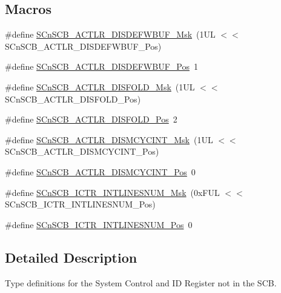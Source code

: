 \subsection*{Macros}
\begin{DoxyCompactItemize}
\item 
\#define \hyperlink{group__CMSIS__SCnSCB_ga6cda7b7219232a008ec52cc8e89d5d08}{S\+Cn\+S\+C\+B\+\_\+\+A\+C\+T\+L\+R\+\_\+\+D\+I\+S\+D\+E\+F\+W\+B\+U\+F\+\_\+\+Msk}~(1\+U\+L $<$$<$ S\+Cn\+S\+C\+B\+\_\+\+A\+C\+T\+L\+R\+\_\+\+D\+I\+S\+D\+E\+F\+W\+B\+U\+F\+\_\+\+Pos)
\item 
\#define \hyperlink{group__CMSIS__SCnSCB_gafa2eb37493c0f8dae77cde81ecf80f77}{S\+Cn\+S\+C\+B\+\_\+\+A\+C\+T\+L\+R\+\_\+\+D\+I\+S\+D\+E\+F\+W\+B\+U\+F\+\_\+\+Pos}~1
\item 
\#define \hyperlink{group__CMSIS__SCnSCB_gaa9dd2d4a2350499188f438d0aa9fd982}{S\+Cn\+S\+C\+B\+\_\+\+A\+C\+T\+L\+R\+\_\+\+D\+I\+S\+F\+O\+L\+D\+\_\+\+Msk}~(1\+U\+L $<$$<$ S\+Cn\+S\+C\+B\+\_\+\+A\+C\+T\+L\+R\+\_\+\+D\+I\+S\+F\+O\+L\+D\+\_\+\+Pos)
\item 
\#define \hyperlink{group__CMSIS__SCnSCB_gaab395870643a0bee78906bb15ca5bd02}{S\+Cn\+S\+C\+B\+\_\+\+A\+C\+T\+L\+R\+\_\+\+D\+I\+S\+F\+O\+L\+D\+\_\+\+Pos}~2
\item 
\#define \hyperlink{group__CMSIS__SCnSCB_ga2a2818f0489ad10b6ea2964e899d4cbc}{S\+Cn\+S\+C\+B\+\_\+\+A\+C\+T\+L\+R\+\_\+\+D\+I\+S\+M\+C\+Y\+C\+I\+N\+T\+\_\+\+Msk}~(1\+U\+L $<$$<$ S\+Cn\+S\+C\+B\+\_\+\+A\+C\+T\+L\+R\+\_\+\+D\+I\+S\+M\+C\+Y\+C\+I\+N\+T\+\_\+\+Pos)
\item 
\#define \hyperlink{group__CMSIS__SCnSCB_gaaa3e79f5ead4a32c0ea742b2a9ffc0cd}{S\+Cn\+S\+C\+B\+\_\+\+A\+C\+T\+L\+R\+\_\+\+D\+I\+S\+M\+C\+Y\+C\+I\+N\+T\+\_\+\+Pos}~0
\item 
\#define \hyperlink{group__CMSIS__SCnSCB_ga3efa0f5210051464e1034b19fc7b33c7}{S\+Cn\+S\+C\+B\+\_\+\+I\+C\+T\+R\+\_\+\+I\+N\+T\+L\+I\+N\+E\+S\+N\+U\+M\+\_\+\+Msk}~(0x\+F\+U\+L $<$$<$ S\+Cn\+S\+C\+B\+\_\+\+I\+C\+T\+R\+\_\+\+I\+N\+T\+L\+I\+N\+E\+S\+N\+U\+M\+\_\+\+Pos)
\item 
\#define \hyperlink{group__CMSIS__SCnSCB_ga0777ddf379af50f9ca41d40573bfffc5}{S\+Cn\+S\+C\+B\+\_\+\+I\+C\+T\+R\+\_\+\+I\+N\+T\+L\+I\+N\+E\+S\+N\+U\+M\+\_\+\+Pos}~0
\end{DoxyCompactItemize}


\subsection{Detailed Description}
Type definitions for the System Control and ID Register not in the S\+CB. 



